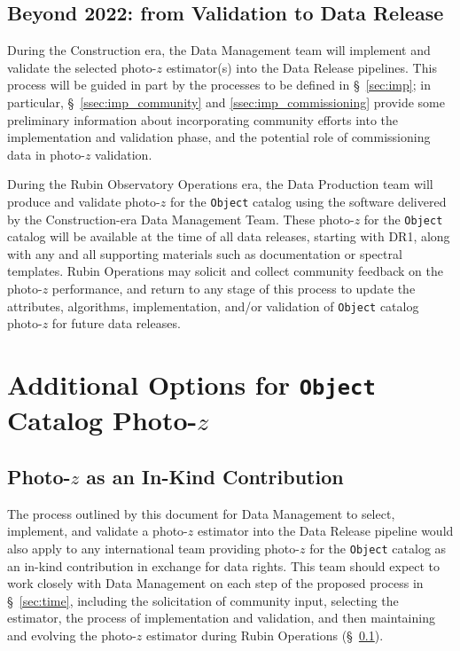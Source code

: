 \documentclass[DM,lsstdraft,toc]{lsstdoc}
\begin{document}
\subsection{Beyond 2022: from Validation to Data Release}\label{ssec:time_opsdr}

During the Construction era, the Data Management team will implement and validate the selected photo-$z$ estimator(s) into the Data Release pipelines.
This process will be guided in part by the processes to be defined in \S~\ref{sec:imp}; in particular, \S~\ref{ssec:imp_community} and \ref{ssec:imp_commissioning} provide some preliminary information about incorporating community efforts into the implementation and validation phase, and the potential role of commissioning data in photo-$z$ validation.

During the Rubin Observatory Operations era, the Data Production team will produce and validate photo-$z$ for the {\tt Object} catalog using the software delivered by the Construction-era Data Management Team.
These photo-$z$ for the {\tt Object} catalog will be available at the time of all data releases, starting with DR1, along with any and all supporting materials such as documentation or spectral templates.
Rubin Operations may solicit and collect community feedback on the photo-$z$ performance, and return to any stage of this process to update the attributes, algorithms, implementation, and/or validation of {\tt Object} catalog photo-$z$ for future data releases.



\clearpage
\section{Additional Options for {\tt Object} Catalog Photo-$z$}\label{sec:opts}

\subsection{Photo-$z$ as an In-Kind Contribution}\label{ssec:opts_inkind}

The process outlined by this document for Data Management to select, implement, and validate a photo-$z$ estimator into the Data Release pipeline would also apply to any international team providing photo-$z$ for the {\tt Object} catalog as an in-kind contribution in exchange for data rights. 
This team should expect to work closely with Data Management on each step of the proposed process in \S~\ref{sec:time}, including the solicitation of community input, selecting the estimator, the process of implementation and validation, and then maintaining and evolving the photo-$z$ estimator during Rubin Operations (\S~\ref{ssec:time_opsdr}).
\end{document}
